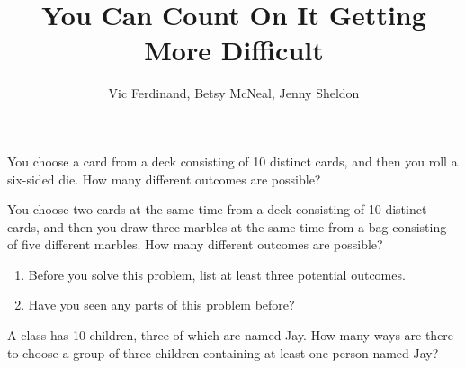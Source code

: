\documentclass[nooutcomes]{ximera}
\title{You Can Count On It Getting More Difficult}
\author{Vic Ferdinand, Betsy McNeal, Jenny Sheldon}
\begin{document}
\begin{abstract}
\end{abstract}
\maketitle





\begin{problem}
You choose a card from a deck consisting of 10 distinct cards, and then you roll a six-sided die.  How many different outcomes are possible?
\end{problem}

\begin{problem}
You choose two cards at the same time from a deck consisting of 10 distinct cards, and then you draw three marbles at the same time from a bag consisting of five different marbles.  How many different outcomes are possible?
\begin{enumerate}
\item Before you solve this problem, list at least three potential outcomes.
\item Have you seen any parts of this problem before?
\end{enumerate}
\vfill
\end{problem}

\begin{problem}
A class has 10 children, three of which are named Jay.  How many ways are there to choose a group of three children containing at least one person named Jay?
\end{problem}

\newpage
\end{document}
